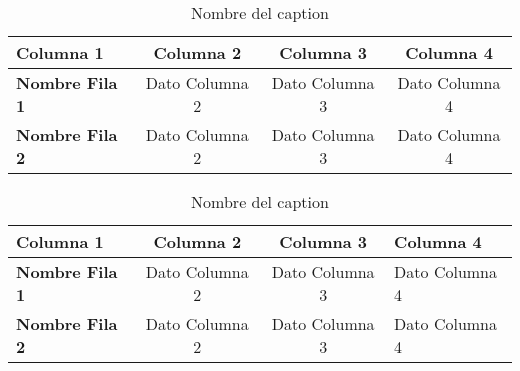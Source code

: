 
\begin{table}[H]
	\centering
	\begin{tabular}{l c c c}
	\toprule
		\textbf{Columna 1}	    & \textbf{Columna 2}	& \textbf{Columna 3}	& \textbf{Columna 4}	\\
	\midrule 
		\textbf{Nombre Fila 1}
            & Dato Columna 2
            & Dato Columna 3
            & Dato Columna 4	\\
		\textbf{Nombre Fila 2}
            & Dato Columna 2
            & Dato Columna 3
            & Dato Columna 4	\\
	\bottomrule
	\end{tabular}
	\caption{Nombre del caption}
	\label{cua:label_referencia}
\end{table}
	
\begin{table}[H]
	\centering
	\begin{tabular}{l c c p{5cm}}
	\toprule
		\textbf{Columna 1}	    & \textbf{Columna 2}	& \textbf{Columna 3}	& \textbf{Columna 4}	\\
	\midrule 
		\textbf{Nombre Fila 1}
            & Dato Columna 2
            & Dato Columna 3
            & Dato Columna 4	\\
		\textbf{Nombre Fila 2}
            & Dato Columna 2
            & Dato Columna 3
            & Dato Columna 4	\\
	\bottomrule
	\end{tabular}
	\caption{Nombre del caption}
	\label{cua:label_referencia}
\end{table}